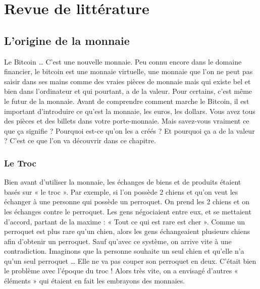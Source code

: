 \documentclass{bredele} %
\begin{document}
\part{Revue de littérature}
\chapter{L'origine de la monnaie}
    Le Bitcoin … C’est une nouvelle monnaie. Peu connu encore dans le domaine financier, le bitcoin est une monnaie virtuelle, une monnaie que l’on ne peut pas saisir dans ses mains comme des vraies pièces de monnaie mais qui existe bel et bien dans l’ordinateur et qui pourtant, a de la valeur. Pour certains, c’est même le futur de la monnaie.
    \newline
    Avant de comprendre comment marche le Bitcoin, il est important d’introduire ce qu’est la monnaie, les euros, les dollars. Vous avez tous des pièces et des billets dans votre porte-monnaie. Mais savez-vous vraiment ce que ça signifie ? Pourquoi est-ce qu’on les a créés ? Et pourquoi ça a de la valeur ? C’est ce que l’on va découvrir dans ce chapitre.
    \section*{Le Troc}
    Bien avant d’utiliser la monnaie, les échanges de biens et de produits étaient basés sur « le troc ». Par exemple, si l’on possède 2 chiens et qu’on veut les échanger à une personne qui possède un perroquet. On prend les 2 chiens et on les échanges contre le perroquet.
    Les gens négociaient entre eux, et se mettaient d’accord, partant de la maxime : « Tout ce qui est rare est cher ». Comme un perroquet est plus rare qu’un chien, alors les gens échangeaient plusieurs chiens afin d’obtenir un perroquet.
    \newline
    Sauf qu’avec ce système, on arrive vite à une contradiction. Imaginons que la personne souhaite un seul chien et qu’elle n’a qu’un seul perroquet … Elle ne va pas couper son perroquet en deux.
    \newline
    C’était bien le problème avec l’époque du troc !
    \newline
    \newline
    Alors très vite, on a envisagé d’autres « éléments » qui étaient en fait les embrayons des monnaies.
\end{document}
